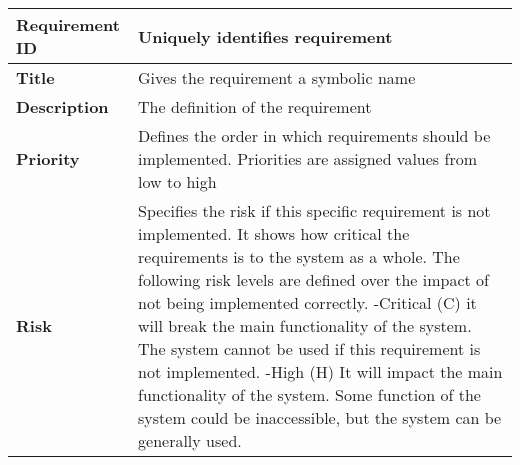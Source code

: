 \begin{center}
	\def\arraystretch{1.5}%
    \begin{tabular}{ | p{5cm} | p{5cm} |}
    \hline
    	\textbf{Requirement ID} & Uniquely identifies requirement \\ \hline
		\textbf{Title} & Gives the requirement a symbolic name\\ \hline
		\textbf{Description} & The definition of the requirement\\ \hline
		\textbf{Priority} & Defines the order in which requirements should be implemented. Priorities are assigned values from low to high\\ \hline
		\textbf{Risk} & Specifies the risk if this specific requirement is not implemented. It shows how critical the requirements is to the system as a whole. The following risk levels are defined over the impact of not being implemented correctly.
 -Critical (C) it will break the main functionality of the system. The system cannot be used if this requirement is not implemented.
 -High (H) It will impact the main functionality of the system. Some function of the system could be inaccessible, but the system can be generally used.\\
      \hline
    \end{tabular}
\end{center}

